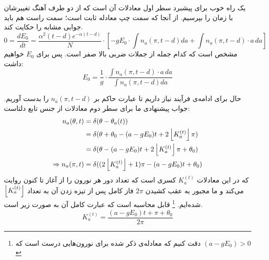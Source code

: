 یک راه خوب برای پیشبرد سطر اول معادلات آن است که از دو طرف آهنگ تغییرشان با زمان را بپرسیم. از آنجا که سمت چپ معادله ثابت است؛ سمت راست هم باید جوابی مشابه را حکایت کند.\\
\begin{equation}
	0 = \frac{dE_0}{dt} = \frac{\alpha^2 (t-d) e^{-\alpha (t-d)}}{N} \cdot [ - gE_0 \cdot \int n_a(\pi,t-d) da + \int n_a(\pi,t-d)\cdot a\,da ]
\end{equation}
مشخص است که کدام جمله از جملات ضربی بالا صفر است. پس برای $E_0$ خواهیم داشت:
\begin{equation}
	E_0 = \frac{1}{g}\cdot \frac{\int n_a(\pi,t-d)\cdot a\,da}{\int n_a(\pi,t-d) da }
\end{equation}

حال برای ادامه‌ی فرآیند نیاز داریم تا عبارت حاکم بر 
$n_a(\pi,t-d)$
را بدست آوریم. جواب پیشنهادی ما برای سطر دوم معادلات از جنس تابع دلتاست:
\begin{align}
	n_a(\theta,t) &= \delta(\theta - \theta_a(t)) \\
	&= \delta(\theta + \theta_0 - (a - g E_0)t + 2 \left\lfloor K^{(t)}_a \right\rfloor\pi )\\
	&= \delta( \theta - (a - g E_0)t + 2 \left\lfloor K^{(t)}_a \right\rfloor \pi + \theta_0  )\\
	\Rightarrow n_a(\pi,t) &= \delta(  (2\left\lfloor K^{(t)}_a \right\rfloor + 1)\pi - (a - g E_0)t + \theta_0   )\\
\end{align}
که در این معادلات 
$K^{(t)}_a$
کسری است که تعداد دور هر نورون را از آغاز تا کنون روایت می‌کند و ما مجبور به عقب کشیدن 
$2\pi$
فاز کامل پس از تیزه زدن آن به تعداد 
$\left\lfloor K^{(t)}_a \right\rfloor$
شده‌ایم.
\footnote{دقت کنیم که معادله‌ی ذکر شده برای نورون‌هایی درست است که 
	$(a - g E_0) > 0 $
}
قابل محاسبه است که عبارت کامل آن به صورت زیر است.
\begin{equation}
	K^{(t)}_a = \frac{(a - gE_0)t + \pi + \theta_0}{2\pi}
\end{equation}

